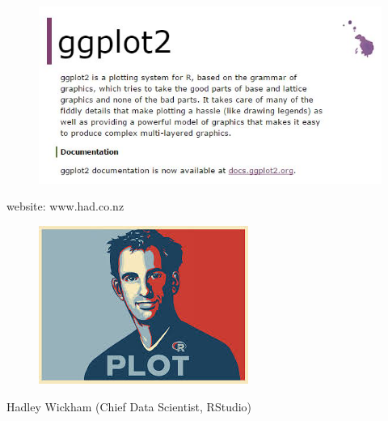 \documentclass{beamer}
\begin{document}
\begin{frame}
	\begin{figure}
\centering
\includegraphics[width=1.1\linewidth]{ggplot2-website}
\end{figure}
website: www.had.co.nz

\end{frame}
\begin{frame}
	\begin{figure}
\centering
\includegraphics[width=0.95\linewidth]{HW}

\end{figure}
Hadley Wickham (Chief Data Scientist, RStudio)
\end{frame}
\end{document}
